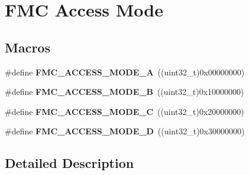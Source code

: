 \hypertarget{group___f_m_c___access___mode}{}\section{F\+MC Access Mode}
\label{group___f_m_c___access___mode}
\subsection*{Macros}
\begin{DoxyCompactItemize}
\item 
\#define {\bfseries F\+M\+C\+\_\+\+A\+C\+C\+E\+S\+S\+\_\+\+M\+O\+D\+E\+\_\+A}~((uint32\+\_\+t)0x00000000)\hypertarget{group___f_m_c___access___mode_ga721ad1bb7db9ca6669b214c87cfcc803}{}\label{group___f_m_c___access___mode_ga721ad1bb7db9ca6669b214c87cfcc803}

\item 
\#define {\bfseries F\+M\+C\+\_\+\+A\+C\+C\+E\+S\+S\+\_\+\+M\+O\+D\+E\+\_\+B}~((uint32\+\_\+t)0x10000000)\hypertarget{group___f_m_c___access___mode_gadee1873c02d935d656de66cc998ff9c5}{}\label{group___f_m_c___access___mode_gadee1873c02d935d656de66cc998ff9c5}

\item 
\#define {\bfseries F\+M\+C\+\_\+\+A\+C\+C\+E\+S\+S\+\_\+\+M\+O\+D\+E\+\_\+C}~((uint32\+\_\+t)0x20000000)\hypertarget{group___f_m_c___access___mode_ga22f235a332eabeb673cb05b931e6e30b}{}\label{group___f_m_c___access___mode_ga22f235a332eabeb673cb05b931e6e30b}

\item 
\#define {\bfseries F\+M\+C\+\_\+\+A\+C\+C\+E\+S\+S\+\_\+\+M\+O\+D\+E\+\_\+D}~((uint32\+\_\+t)0x30000000)\hypertarget{group___f_m_c___access___mode_gaa98f7809223f4d9c5f8dec47fb5ad590}{}\label{group___f_m_c___access___mode_gaa98f7809223f4d9c5f8dec47fb5ad590}

\end{DoxyCompactItemize}


\subsection{Detailed Description}
